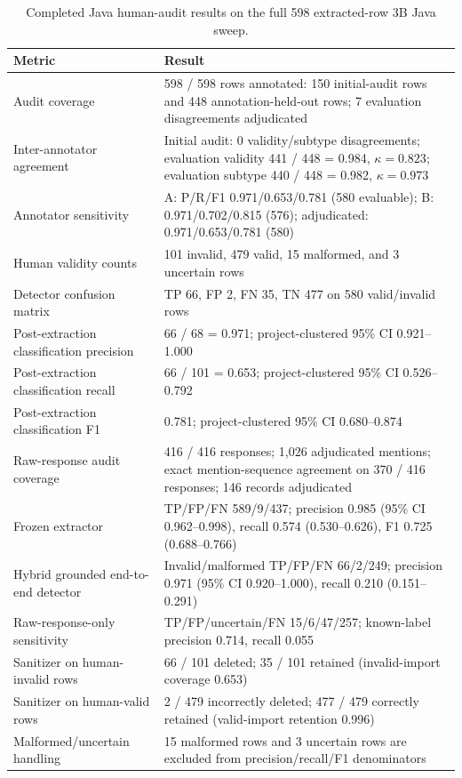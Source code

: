 \documentclass[pdflatex,sn-basic]{sn-jnl}
\begin{document}
\begin{table}[htbp]
\centering
\caption{Completed Java human-audit results on the full 598 extracted-row 3B Java sweep.}
\label{tab:human-audit}
{\footnotesize
\setlength{\tabcolsep}{4pt}
\begin{tabularx}{\linewidth}{@{}lY@{}}
\toprule
Metric & Result \\
\midrule
Audit coverage & 598 / 598 rows annotated: 150 initial-audit rows and 448 annotation-held-out rows; 7 evaluation disagreements adjudicated \\
Inter-annotator agreement & Initial audit: 0 validity/subtype disagreements; evaluation validity 441 / 448 = 0.984, $\kappa=0.823$; evaluation subtype 440 / 448 = 0.982, $\kappa=0.973$ \\
Annotator sensitivity & A: P/R/F1 0.971/0.653/0.781 (580 evaluable); B: 0.971/0.702/0.815 (576); adjudicated: 0.971/0.653/0.781 (580) \\
Human validity counts & 101 invalid, 479 valid, 15 malformed, and 3 uncertain rows \\
Detector confusion matrix & TP 66, FP 2, FN 35, TN 477 on 580 valid/invalid rows \\
Post-extraction classification precision & 66 / 68 = 0.971; project-clustered 95\% CI 0.921--1.000 \\
Post-extraction classification recall & 66 / 101 = 0.653; project-clustered 95\% CI 0.526--0.792 \\
Post-extraction classification F1 & 0.781; project-clustered 95\% CI 0.680--0.874 \\
Raw-response audit coverage & 416 / 416 responses; 1,026 adjudicated mentions; exact mention-sequence agreement on 370 / 416 responses; 146 records adjudicated \\
Frozen extractor & TP/FP/FN 589/9/437; precision 0.985 (95\% CI 0.962--0.998), recall 0.574 (0.530--0.626), F1 0.725 (0.688--0.766) \\
Hybrid grounded end-to-end detector & Invalid/malformed TP/FP/FN 66/2/249; precision 0.971 (95\% CI 0.920--1.000), recall 0.210 (0.151--0.291) \\
Raw-response-only sensitivity & TP/FP/uncertain/FN 15/6/47/257; known-label precision 0.714, recall 0.055 \\
Sanitizer on human-invalid rows & 66 / 101 deleted; 35 / 101 retained (invalid-import coverage 0.653) \\
Sanitizer on human-valid rows & 2 / 479 incorrectly deleted; 477 / 479 correctly retained (valid-import retention 0.996) \\
Malformed/uncertain handling & 15 malformed rows and 3 uncertain rows are excluded from precision/recall/F1 denominators \\
\bottomrule
\end{tabularx}
}
\end{table}
\end{document}
